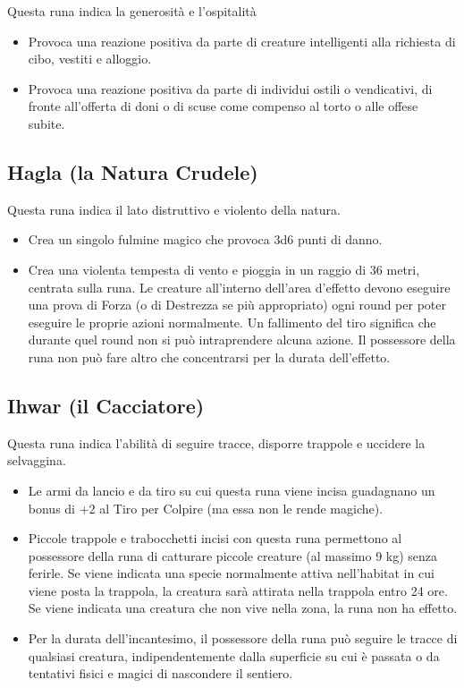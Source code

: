 \documentclass[10pt,a4paper]{article}
\begin{document}
Questa runa indica la generosit\`{a} e l'ospitalit\`{a}
  \begin{itemize}
\item       Provoca una reazione positiva da parte di creature intelligenti alla richiesta di cibo, vestiti e alloggio.
 
\item       Provoca una reazione positiva da parte di individui ostili o vendicativi, di fronte all'offerta di doni o di scuse come compenso al torto o alle offese subite.
 \end{itemize}
 
 
\subsection*{Hagla (la Natura Crudele)}
 
Questa runa indica il lato distruttivo e violento della natura.
  \begin{itemize}
\item       Crea un singolo fulmine magico che provoca 3d6 punti di danno.
 
\item       Crea una violenta tempesta di vento e pioggia in un raggio di 36 metri, centrata sulla runa. Le creature all'interno dell'area d'effetto devono eseguire una prova di Forza (o di Destrezza se pi\`{u} appropriato) ogni round per poter eseguire le proprie azioni normalmente. Un fallimento del tiro significa che durante quel round non si pu\`{o} intraprendere alcuna azione. Il possessore della runa non pu\`{o} fare altro che concentrarsi per la durata dell'effetto.
 \end{itemize}
 
 
\subsection*{Ihwar (il Cacciatore)}
 
Questa runa indica l'abilit\`{a} di seguire tracce, disporre trappole e uccidere la selvaggina.
  \begin{itemize}
\item       Le armi da lancio e da tiro su cui questa runa viene incisa guadagnano un bonus di $+2$ al Tiro per Colpire (ma essa non le rende magiche).
 
\item       Piccole trappole e trabocchetti incisi con questa runa permettono al possessore della runa di catturare piccole creature (al massimo 9 kg) senza ferirle. Se viene indicata una specie normalmente attiva nell'habitat in cui viene posta la trappola, la creatura sar\`{a} attirata nella trappola entro 24 ore. Se viene indicata una creatura che non vive nella zona, la runa non ha effetto.
 
\item        Per la durata dell'incantesimo, il possessore della runa pu\`{o} seguire le tracce di qualsiasi creatura, indipendentemente dalla superficie su cui \`{e} passata o da tentativi fisici e magici di nascondere il sentiero.
 \end{itemize}
 
\end{document}
